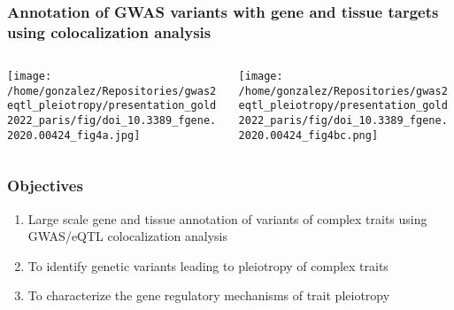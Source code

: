 \documentclass{beamer}
\begin{document}
\begin{frame}
\frametitle{Annotation of GWAS variants with gene and tissue targets using colocalization analysis}

\begin{columns}
\begin{column}{0.5\textwidth}
    \begin{center}
\texttt{[image: /home/gonzalez/Repositories/gwas2eqtl\_pleiotropy/presentation\_gold2022\_paris/fig/doi\_10.3389\_fgene.2020.00424\_fig4a.jpg]}
     \end{center}
\end{column}
\begin{column}{0.5\textwidth}
    \begin{center}
\texttt{[image: /home/gonzalez/Repositories/gwas2eqtl\_pleiotropy/presentation\_gold2022\_paris/fig/doi\_10.3389\_fgene.2020.00424\_fig4bc.png]}
     \end{center}
\end{column}
\end{columns}

\let\thefootnote\relax{}
\end{frame}

\begin{frame}
\frametitle{Objectives}

\begin{enumerate}
\item Large scale gene and tissue annotation of variants of complex traits using GWAS/eQTL colocalization analysis
\item To identify genetic variants leading to pleiotropy of complex traits
\item To characterize the gene regulatory mechanisms of trait pleiotropy
\end{enumerate}
\end{frame}
\end{document}
